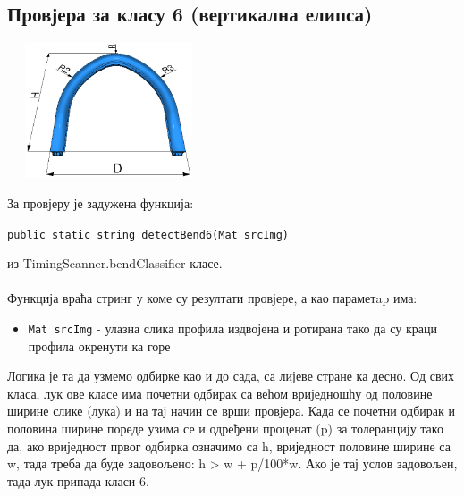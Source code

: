 \documentclass[12pt]{article}
\begin{document}
\subsection{Провјера за класу 6 (вертикална елипса)}
\vspace{0.5cm}
\begin{center}
    \centering 
    \includegraphics[height=4cm, width=6cm]{images/klasa6.jpg}
\end{center}
\vspace{0.5cm}
За провјеру је задужена функција:
\begin{center}
\texttt{public static string detectBend6(Mat srcImg)}
\end{center}
из TimingScanner.bendClassifier класе.\\\\
Функција враћа стринг у коме су резултати провјере, а као параметap има:
\begin{itemize}
    \item \texttt{Mat srcImg} - улазна слика профила издвојена и ротирана тако да су краци профила окренути ка горе 
\end{itemize}
Логика је та да узмемо одбирке као и до сада, са лијеве стране ка десно. Од свих класа, лук ове класе има почетни одбирак са већом вриједношћу од половине ширине слике (лука) и на тај начин се врши провјера. Када се почетни одбирак и половина ширине пореде узима се и одређени проценат (p) за толеранцију тако да, ако вриједност првог одбирка означимо са h, вриједност половине ширине са w, тада треба да буде задовољено: h > w + p/100*w. Ако је тај услов задовољен, тада лук припада класи 6.
\end{document}
